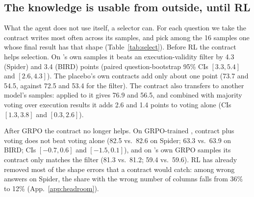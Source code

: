 \subsection{The knowledge is usable from outside, until RL}
\label{sec:select}
What the agent does not use itself, a selector can. For each question we take the contract \armG{} writes most often across its samples, and pick among the 16 samples one whose final result has that shape (Table~\ref{tab:select}).
Before RL the contract helps selection. On \armG's own samples it beats an execution-validity filter by 4.3 (Spider) and 3.4 (BIRD) points (paired question-bootstrap 95\% CIs $[3.3, 5.4]$ and $[2.6, 4.3]$). The placebo's own contracts add only about one point (73.7 and 54.5, against 72.5 and 53.4 for the filter). The contract also transfers to another model's samples: applied to \armA{} it gives 76.9 and 56.5, and combined with majority voting over execution results it adds 2.6 and 1.4 points to voting alone (CIs $[1.3, 3.8]$ and $[0.3, 2.6]$).

After GRPO the contract no longer helps. On GRPO-trained \armA{}, contract plus voting does not beat voting alone (82.5 vs.\ 82.6 on Spider; 63.3 vs.\ 63.9 on BIRD; CIs $[-0.7, 0.6]$ and $[-1.5, 0.1]$), and on \armG's own GRPO samples its contract only matches the filter (81.3 vs.\ 81.2; 59.4 vs.\ 59.6). RL has already removed most of the shape errors that a contract would catch: among wrong answers on Spider, the share with the wrong number of columns falls from 36\% to 12\% (App.~\ref{app:headroom}).

